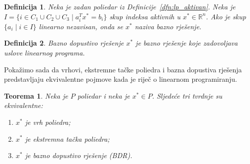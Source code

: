 \documentclass[a4paper, utf8, 11pt, colorlinks]{book}
\newtheorem{definition}{Definicija}[chapter]
\newtheorem{thm}{Teorema}[chapter]
\theoremstyle{definition}
\begin{document}
\begin{definition}
      Neka je zadan poliedar iz Definicije~\ref{dfn:lp_aktivan}. Neka je 
      $I = \{ i \in C_1 \cup C_2 \cup C_3 \mid a_i^T x^* = b_i \}$  skup indeksa aktivnih u $x^*\in \mathbb{R}^n$.  Ako je skup $\{ a_i \mid i \in I \}$ linearno nezavisan, onda se $x^*$  naziva bazno rješenje. 
\end{definition}
\begin{definition}
	 Bazno dopustivo rješenje $x^*$ je bazno rješenje koje zadovoljava  uslove linearnog programa. 
\end{definition}
Pokažimo sada da  vrhovi, ekstremne tačke poliedra i bazna dopustiva rješenja predstavljaju ekvivalentne pojmove kada je riječ o linearnom programiranju.

\begin{thm}
   Neka je $P$ poliedar i neka je $x^* \in P$. Sljedeće tri tvrdnje su ekvivalentne:
   \begin{enumerate}
       \item $x^*$ je vrh poliedra;
       \item $x^*$ je ekstremna tačka poliedra;
       \item $x^*$ je bazno dopustivo rješenje (BDR).
   \end{enumerate}
\end{thm}
\end{document}
